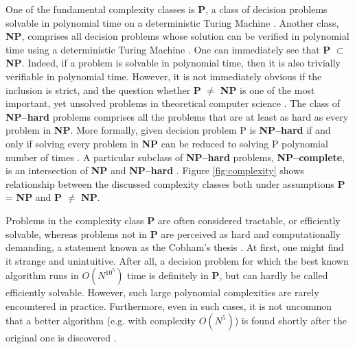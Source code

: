 One of the fundamental complexity classes is \textbf{P}, a class of decision problems solvable in polynomial time on a deterministic Turing Machine  \cite{arora}. Another class, \textbf{NP}, comprises all decision problems whose solution can be verified in polynomial time using a deterministic Turing Machine \cite{arora}.
One can immediately see that \textbf{P} $\subset$ \textbf{NP}. Indeed, if a problem is solvable in polynomial time, then it is also trivially verifiable in polynomial time. However, it is not immediately obvious if the inclusion is strict, and the question whether \textbf{P} $\ne$ \textbf{NP} is one of the most important, yet unsolved problems in theoretical computer science \cite{fortnow}.
The class of \textbf{NP--hard} problems comprises all the problems that are at least as hard as
every problem in \textbf{NP}. More formally, given decision problem P is \textbf{NP--hard} if and
only if solving every problem in \textbf{NP} can be reduced to solving P polynomial number of times
\cite{arora}. A particular subclass of \textbf{NP--hard} problems, \textbf{NP--complete}, is an
intersection of \textbf{NP} and \textbf{NP--hard} \cite{arora}. Figure \ref{fig:complexity} shows
relationship between the discussed complexity classes both under assumptions \textbf{P} =
\textbf{NP} and \textbf{P} $\ne$ \textbf{NP}.

Problems in the complexity class \textbf{P} are often considered tractable, or efficiently solvable,
whereas problems not in \textbf{P} are perceived as hard and computationally demanding, a statement
known as the Cobham's thesis \cite{cobham, arora}. At first, one might find it strange and
unintuitive. After all, a decision problem for which the best known algorithm runs in $O(N^{10^5})$
time is definitely in  \textbf{P}, but can hardly be called efficiently solvable. However, such
large polynomial complexities are rarely encountered in practice. Furthermore, even in such cases,
it is not uncommon that a better algorithm (e.g. with complexity $O(N^5)$) is found shortly after
the original one is discovered \cite{arora}.

